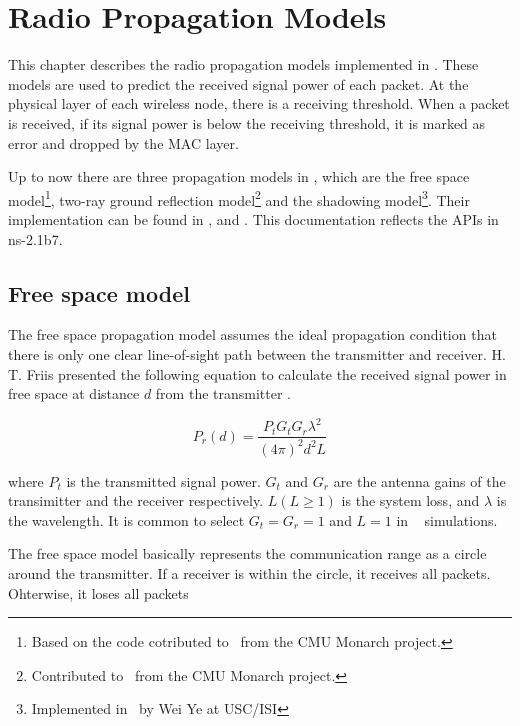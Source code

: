 
\chapter{Radio Propagation Models}
\label{chap:propagation}

This chapter describes the radio propagation models implemented in \ns.
These models are used to predict the received signal power of
each packet. At the physical layer of each wireless node, there is a receiving
threshold. When a packet is received, if its signal power is below the receiving
threshold, it is marked as error and dropped by the MAC layer.

Up to now there are three propagation models in \ns, which are the free
space model\footnote{Based on the code cotributed to \ns~from the CMU Monarch
project.}, two-ray ground reflection model\footnote{Contributed to \ns~from the
CMU Monarch project.} and the shadowing model\footnote{Implemented in \ns~by
Wei Ye at USC/ISI}. Their implementation can be found in ,
 and . This documentation
reflects the APIs in ns-2.1b7.

\section{Free space model}
\label{sec:freespace}

The free space propagation model assumes the ideal propagation condition
that there is only one clear line-of-sight path between the transmitter and
receiver. H. T. Friis presented the following equation to
calculate the received signal power in free space at distance $d$ from the
transmitter \cite{Friis46}.

\begin{equation}
  P_r (d) = \frac{P_t G_t G_r \lambda^2}{(4\pi)^2 d^2 L}
  \label{eqn:freespace}
\end{equation}

where $P_t$ is the transmitted signal power. $G_t$ and $G_r$ are the antenna
gains of the transimitter and the receiver respectively. $L (L\ge1)$ is the
system loss, and $\lambda$ is the wavelength. It is common to select
$G_t = G_r = 1$ and $L = 1$ in \ns~ simulations.

The free space model basically represents the communication range as a circle
around the transmitter. If a receiver is within the circle, it receives all
packets. Ohterwise, it loses all packets

